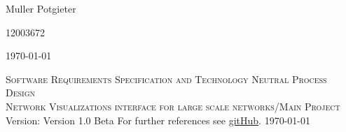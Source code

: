 \documentclass[a4paper,12pt]{report}
\begin{document}
\begin{titlepage}
\begin{center}
\begin{minipage}{0.4\textwidth}
\begin{flushleft} \large
Muller {Potgieter}
\end{flushleft}
\end{minipage}
\begin{minipage}{0.4\textwidth}
\begin{flushright} \large
\emph{}
12003672
\end{flushright}
\end{minipage}


\vfill
{\large \today}
\end{center}
\end{titlepage}
\footnotesize
%
\normalsize

\renewcommand{\thesection}{\arabic{section}}
\newpage
\begin{center}
\textsc{\LARGE Software Requirements Specification and Technology Neutral Process Design}\\[1.5cm]
\textsc{\Large Network Visualizations interface for large scale networks/Main Project}\\[0.5cm]
Version: Version 1.0 Beta
For further references see \href{ https://github.com/u13133064/NotLikeThis}{gitHub}.
\today
\end{center}
\tableofcontents{}
\newpage
\end{document}
